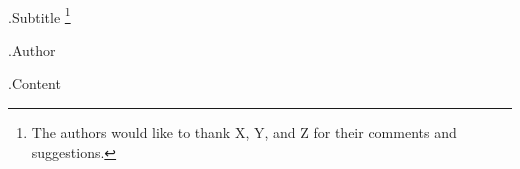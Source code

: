 \documentclass[10pt,article,a4paper,oneside]{memoir}
\begin{document}
\begingroup
\center
\vspace*{2\baselineskip}
{\textcolor{darkgray}{\fontsize{29.87pt}{39.82pt}}}\\[\baselineskip]
{\huge {{.Subtitle}} \footnote{The authors would like to thank X, Y, and Z for their comments and suggestions.}}\\[\baselineskip]
\par
\vspace*{2\baselineskip}
{\Large {{.Author}}}\\
\endgroup

\thispagestyle{empty}

\newpage
\tableofcontents
\newpage

{{.Content}}

\newpage
\printbibliography
\end{document}
